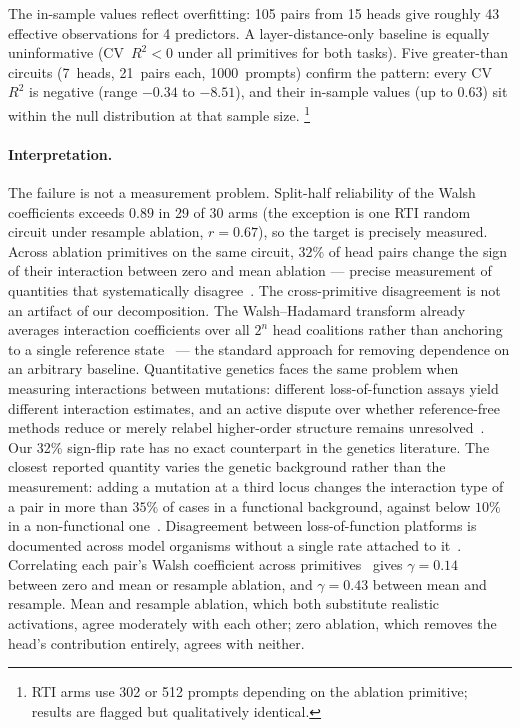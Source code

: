 \documentclass{article}
\begin{document}
\medskip

\noindent The in-sample values reflect overfitting: 105 pairs from 15 heads
give roughly 43 effective observations for 4 predictors. A
layer-distance-only baseline is equally uninformative (CV~$R^2 < 0$ under
all primitives for both tasks). Five greater-than circuits (7~heads,
21~pairs each, 1000~prompts) confirm the pattern: every CV~$R^2$ is
negative (range $-0.34$ to $-8.51$), and their in-sample values (up to
$0.63$) sit within the null distribution at that sample size.%
\footnote{RTI arms use 302 or 512 prompts depending on the ablation
primitive; results are flagged but qualitatively identical.}

\paragraph{Interpretation.}

The failure is not a measurement problem. Split-half reliability of the Walsh
coefficients exceeds $0.89$ in 29 of 30 arms (the exception is one RTI random
circuit under resample ablation, $r = 0.67$), so the target is precisely
measured. Across ablation primitives on the same circuit, $32\%$ of head pairs
change the sign of their interaction between zero and mean ablation --- precise
measurement of quantities that systematically
disagree~\citep{housden2017comparison}.
The cross-primitive disagreement is not an artifact of our decomposition.
The Walsh--Hadamard transform already averages interaction coefficients over
all $2^n$ head coalitions rather than anchoring to a single reference
state~\citep{poelwijk2016context,poelwijk2019learning} --- the standard
approach for removing dependence on an arbitrary baseline. Quantitative
genetics faces the same problem when measuring interactions between mutations:
different loss-of-function assays yield different interaction estimates, and an
active dispute over whether reference-free methods reduce or merely relabel
higher-order structure remains
unresolved~\citep{park2024simplicity,dupic2024protein,buda2024higher}. Our
32\% sign-flip rate has no exact counterpart in the genetics literature.
The closest reported quantity varies the genetic background rather than
the measurement: adding a mutation at a third locus changes the
interaction type of a pair in more than $35\%$ of cases in a functional
background, against below $10\%$ in a non-functional
one~\citep{fluidity2024elife}. Disagreement between loss-of-function
platforms is documented across model organisms without a single rate
attached to it~\citep{housden2017comparison}. Correlating each
pair's Walsh coefficient across primitives~\citep{ferretti2016measuring} gives
$\gamma = 0.14$ between zero and mean or resample ablation, and $\gamma = 0.43$
between mean and resample. Mean and resample ablation, which both substitute
realistic activations, agree moderately with each other; zero ablation, which
removes the head's contribution entirely, agrees with neither.
\end{document}
